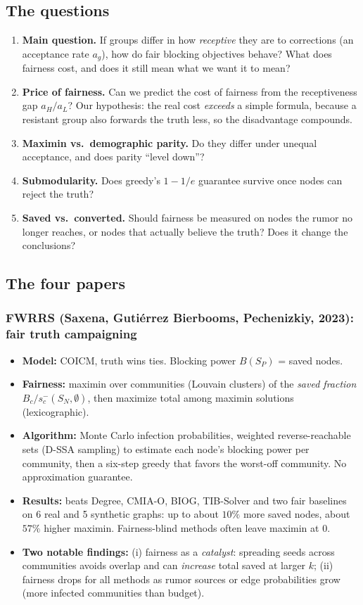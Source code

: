\documentclass[11pt]{article}
\begin{document}
\subsection{The questions}
\begin{enumerate}
\item \textbf{Main question.} If groups differ in how \emph{receptive} they are to corrections (an acceptance rate $a_g$), how do fair blocking objectives behave? What does fairness cost, and does it still mean what we want it to mean?
\item \textbf{Price of fairness.} Can we predict the cost of fairness from the receptiveness gap $a_H/a_L$? Our hypothesis: the real cost \emph{exceeds} a simple formula, because a resistant group also forwards the truth less, so the disadvantage compounds.
\item \textbf{Maximin vs.\ demographic parity.} Do they differ under unequal acceptance, and does parity ``level down''?
\item \textbf{Submodularity.} Does greedy's $1-1/e$ guarantee survive once nodes can reject the truth?
\item \textbf{Saved vs.\ converted.} Should fairness be measured on nodes the rumor no longer reaches, or nodes that actually believe the truth? Does it change the conclusions?
\end{enumerate}

\subsection{The four papers}

\subsubsection*{FWRRS (Saxena, Guti\'errez Bierbooms, Pechenizkiy, 2023): fair truth campaigning}
\begin{itemize}
\item \textbf{Model:} COICM, truth wins ties. Blocking power $B(S_P)$ = saved nodes.
\item \textbf{Fairness:} maximin over communities (Louvain clusters) of the \emph{saved fraction} $B_c/s^-_c(S_N,\emptyset)$, then maximize total among maximin solutions (lexicographic).
\item \textbf{Algorithm:} Monte Carlo infection probabilities, weighted reverse-reachable sets (D-SSA sampling) to estimate each node's blocking power per community, then a six-step greedy that favors the worst-off community. No approximation guarantee.
\item \textbf{Results:} beats Degree, CMIA-O, BIOG, TIB-Solver and two fair baselines on 6 real and 5 synthetic graphs: up to about $10\%$ more saved nodes, about $57\%$ higher maximin. Fairness-blind methods often leave maximin at $0$.
\item \textbf{Two notable findings:} (i) fairness as a \emph{catalyst}: spreading seeds across communities avoids overlap and can \emph{increase} total saved at larger $k$; (ii) fairness drops for all methods as rumor sources or edge probabilities grow (more infected communities than budget).
\end{itemize}
\end{document}

